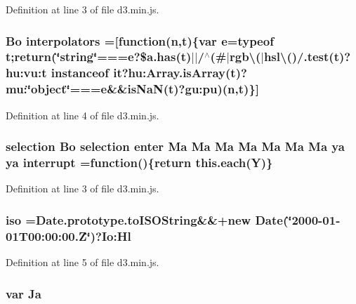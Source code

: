 Definition at line 3 of file d3.\+min.\+js.

\subsubsection[{interpolators}]{ {\bf Bo} interpolators =[function({\bf n},t)\{var {\bf e}=typeof t;{\bf return}(\char`\"{}string\char`\"{}===e?\$a.\+has(t)$\vert$$\vert$/$^\wedge$(\#$\vert$rgb\textbackslash{}($\vert$hsl\textbackslash{}()/.test(t)?hu\+:vu\+:t instanceof it?hu\+:\+Array.\+is\+Array(t)?mu\+:\char`\"{}object\char`\"{}===e\&\&is\+Na\+N(t)?gu\+:pu)({\bf n},t)\}]}\label{d3_8min_8js_a3453ce95eb50250a4e93398167abf26e}


Definition at line 4 of file d3.\+min.\+js.

\subsubsection[{interrupt}]{ {\bf selection} {\bf Bo} {\bf selection} {\bf enter} {\bf Ma} {\bf Ma} {\bf Ma} {\bf Ma} {\bf Ma} {\bf Ma} {\bf Ma} {\bf ya} {\bf ya} interrupt =function()\{{\bf return} {\bf this.\+each}(Y)\}}\label{d3_8min_8js_a478568b8cf4da03350d46364daffe1ab}


Definition at line 3 of file d3.\+min.\+js.

\subsubsection[{iso}]{ iso =Date.\+prototype.\+to\+I\+S\+O\+String\&\&+new Date(\char`\"{}2000-\/01-\/01\+T00\+:00\+:00.\+Z\char`\"{})?\+Io\+:\+Hl}\label{d3_8min_8js_a41309a5e0af102dd8e70a0496c2d07de}


Definition at line 5 of file d3.\+min.\+js.

\subsubsection[{Ja}]{\setlength{\rightskip}{0pt plus 5cm}var Ja}\label{d3_8min_8js_a1b94384704a86db4d4cdeb06792ab307}


